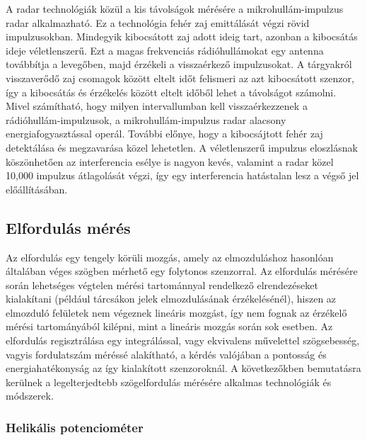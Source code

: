 A radar technológiák közül a kis távolságok mérésére a mikrohullám-impulzus radar alkalmazható. Ez a technológia fehér zaj emittálását végzi rövid impulzusokban. Mindegyik kibocsátott zaj adott ideig tart, azonban a kibocsátás ideje véletlenszerű. Ezt a magas frekvenciás rádióhullámokat egy antenna továbbítja a levegőben, majd érzékeli a visszaérkező impulzusokat. A tárgyakról visszaverődő zaj csomagok között eltelt időt felismeri az azt kibocsátott szenzor, így a kibocsátás és érzékelés között eltelt időből lehet a távolságot számolni. Mivel számítható, hogy milyen intervallumban kell visszaérkezzenek a rádióhullám-impulzusok, a mikrohullám-impulzus radar alacsony energiafogyasztással operál. További előnye, hogy a kibocsájtott fehér zaj detektálása és megzavarása közel lehetetlen. A véletlenszerű impulzus eloszlásnak köszönhetően az interferencia esélye is nagyon kevés, valamint a radar közel 10,000 impulzus átlagolását végzi, így egy interferencia hatástalan lesz a végső jel előállításában.

\subsection{Elfordulás mérés}
\label{elford}

Az elfordulás egy tengely körüli mozgás, amely az elmozduláshoz hasonlóan általában véges szögben mérhető egy folytonos szenzorral. Az elfordulás mérésére során lehetséges végtelen mérési tartománnyal rendelkező elrendezéseket kialakítani (például tárcsákon jelek elmozdulásának érzékelésénél), hiszen az elmozduló felületek nem végeznek lineáris mozgást, így nem fognak az érzékelő mérési tartományából kilépni, mint a lineáris mozgás során sok esetben. Az elfordulás regisztrálása egy integrálással, vagy ekvivalens művelettel szögsebesség, vagyis fordulatszám méréssé alakítható, a kérdés valójában a pontosság és energiahatékonyság az így kialakított szenzoroknál. A következőkben bemutatásra kerülnek a legelterjedtebb szögelfordulás mérésére alkalmas technológiák és módszerek.

\subsubsection{Helikális potenciométer}

